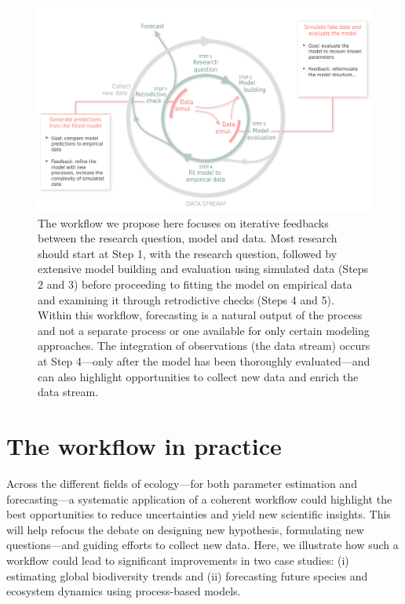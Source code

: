 \documentclass[11pt]{article}
\begin{document}
\begin{figure}[h]
	\centering
	\vspace*{-0.1cm}
    \hspace*{-1.5cm}
	\includegraphics{figures/figure_worflow_wsteps}
	\caption{The workflow we propose here \citep[which builds from recent advances in workflows,][]{betanworkflow,Gelman2020,Schad2020,grinsztajn2021,vandeschoot2021,Wolkovich2024} focuses on iterative feedbacks between the research question, model and data. Most research should start at Step 1, with the research question, followed by extensive model building and evaluation using simulated data (Steps 2 and 3) before proceeding to fitting the model on empirical data and examining it through retrodictive checks (Steps 4 and 5). Within this workflow, forecasting is a natural output of the process and not a separate process or one available for only certain modeling approaches.  The integration of observations (the data stream) occurs at Step 4---only after the model has been thoroughly evaluated---and can also highlight opportunities to collect new data and enrich the data stream.}
	\vspace*{-0.5cm}
	\label{fig:workflow}
\end{figure}

\section{The workflow in practice}

Across the different fields of ecology---for both parameter estimation and forecasting---a systematic application of a coherent workflow could highlight the best opportunities to reduce uncertainties and yield new scientific insights. This will help refocus the debate on designing new hypothesis, formulating new questions---and guiding efforts to collect new data. Here, we illustrate how such a workflow could lead to significant improvements in two case studies: (i) estimating global biodiversity trends and (ii) forecasting future species and ecosystem dynamics using process-based models.
\end{document}
